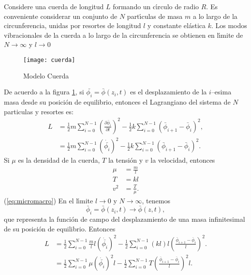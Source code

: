 Considere una cuerda de longitud $L$ formando un c\'\i rculo de radio $R$.
Es conveniente considerar un conjunto de $N$ part\'\i culas de masa $m$ a
lo largo de la circunferencia, unidas por resortes de longitud $l$ y
constante el\'astica $k$. Los modos vibracionales de la cuerda a lo
largo de la circunferencia se obtienen en l\'\i mite de $N\to\infty$ y $l\to0$ 

\begin{figure} %
  \centering %
  \texttt{[image: cuerda]} %
  \caption{Modelo Cuerda} %
  \label{fig:1string} %
\end{figure} %
De acuerdo a la figura 
\ref{fig:1string}, %
si $\bar{\phi_i}=\bar{\phi}(z_i,t)$ es el
desplazamiento de la $i$--esima masa desde su posici\'on de equilibrio,
entonces el Lagrangiano del sistema de $N$ particulas y resortes es:
\begin{align}
  \label{eq:1strLsum} %
  L&=\frac{1}{2}m\sum_{i=0}^{N-1}
  \left(
\frac{\partial\bar\phi_i}{\partial t}
  \right)^2-\frac{1}{2}k\sum_{i=0}^{N-1}
  \left(
\bar\phi_{i+1}-\bar\phi_{i}
  \right)^2,\\
  \label{eq:1strLsumdot} 
&=\frac{1}{2}m\sum_{i=0}^{N-1}
  \left(
    \dot{\bar{\phi_i}}
  \right)^2-\frac{1}{2}k\sum_{i=0}^{N-1}
  \left(
\bar\phi_{i+1}-\bar\phi_{i}
  \right)^2.
\end{align}
Si $\mu$ es la densidad de la cuerda, $T$ la tensi\'on y $v$ la velocidad, entonces
\begin{align}
  \label{eq:micromacro}
  \mu&=\frac{m}{l}\nonumber\\
  T&=kl\\
  v^2&=\frac{T}{\mu}.\nonumber
\end{align}
(\ref{eq:micromacro})
En el l\'\i mite $l\to0$ y $N\to\infty$, tenemos
\begin{equation}
  \label{eq:barf}
  \bar\phi_i=\bar\phi(z_i,t)\to\bar\phi(z,t),
\end{equation}
que representa la funci\'on de campo del desplazamiento de una masa
infinitesimal de su posici\'on de equilibrio. Entonces
\begin{align}
L&=\frac{1}{2}\sum_{i=0}^{N-1}\frac{m}{l}l
  \left(
    \dot{\bar{\phi_i}}
  \right)^2-\frac{1}{2}\sum_{i=0}^{N-1}(k l) l
  \left(
\frac{\bar\phi_{i+1}-\bar\phi_{i}}{l}
  \right)^2.\nonumber\\
&=\frac{1}{2}\sum_{i=0}^{N-1}\mu
  \left(
    \dot{\bar{\phi_i}}
  \right)^2l-\frac{1}{2}\sum_{i=0}^{N-1}T
  \left(
\frac{\bar\phi_{i+1}-\bar\phi_{i}}{l}
  \right)^2l.
\label{eq:1strLsumm}
\end{align}
